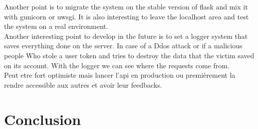 Another point is to migrate the system on the stable version of flask and mix it with gunicorn or uwsgi. It is also interesting to leave the localhost area and test the system on a real environment.\\

Another interesting point to develop in the future is to set a logger system that saves everything done on the server. In case of a Ddos attack or if a malicious people Who stole a user token and tries to destroy the data that the victim saved on its account. With the logger we can see where the requests come from.\\


Peut etre fort optimiste mais lancer l'api en production ou premièrement la rendre accessible aux autres et avoir leur feedbacks.
\section{Conclusion}
